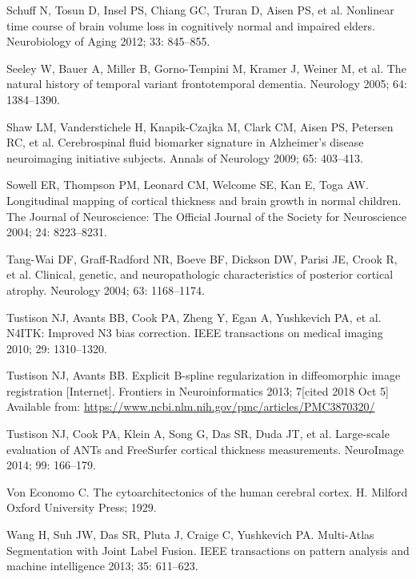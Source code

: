 \documentclass[]{article}
\begin{document}
\hypertarget{ref-schuff_nonlinear_2012}{}
Schuff N, Tosun D, Insel PS, Chiang GC, Truran D, Aisen PS, et al.
Nonlinear time course of brain volume loss in cognitively normal and
impaired elders. Neurobiology of Aging 2012; 33: 845--855.

\hypertarget{ref-seeley_natural_2005}{}
Seeley W, Bauer A, Miller B, Gorno-Tempini M, Kramer J, Weiner M, et al.
The natural history of temporal variant frontotemporal dementia.
Neurology 2005; 64: 1384--1390.

\hypertarget{ref-shaw_cerebrospinal_2009}{}
Shaw LM, Vanderstichele H, Knapik-Czajka M, Clark CM, Aisen PS, Petersen
RC, et al. Cerebrospinal fluid biomarker signature in Alzheimer's
disease neuroimaging initiative subjects. Annals of Neurology 2009; 65:
403--413.

\hypertarget{ref-sowell_longitudinal_2004}{}
Sowell ER, Thompson PM, Leonard CM, Welcome SE, Kan E, Toga AW.
Longitudinal mapping of cortical thickness and brain growth in normal
children. The Journal of Neuroscience: The Official Journal of the
Society for Neuroscience 2004; 24: 8223--8231.

\hypertarget{ref-tang-wai_clinical_2004}{}
Tang-Wai DF, Graff-Radford NR, Boeve BF, Dickson DW, Parisi JE, Crook R,
et al. Clinical, genetic, and neuropathologic characteristics of
posterior cortical atrophy. Neurology 2004; 63: 1168--1174.

\hypertarget{ref-tustison_n4itk:_2010}{}
Tustison NJ, Avants BB, Cook PA, Zheng Y, Egan A, Yushkevich PA, et al.
N4ITK: Improved N3 bias correction. IEEE transactions on medical imaging
2010; 29: 1310--1320.

\hypertarget{ref-tustison_explicit_2013}{}
Tustison NJ, Avants BB. Explicit B-spline regularization in
diffeomorphic image registration {[}Internet{]}. Frontiers in
Neuroinformatics 2013; 7{[}cited 2018 Oct 5{]} Available from:
\url{https://www.ncbi.nlm.nih.gov/pmc/articles/PMC3870320/}

\hypertarget{ref-tustison_large-scale_2014}{}
Tustison NJ, Cook PA, Klein A, Song G, Das SR, Duda JT, et al.
Large-scale evaluation of ANTs and FreeSurfer cortical thickness
measurements. NeuroImage 2014; 99: 166--179.

\hypertarget{ref-von_economo_cytoarchitectonics_1929}{}
Von Economo C. The cytoarchitectonics of the human cerebral cortex. H.
Milford Oxford University Press; 1929.

\hypertarget{ref-wang_multi-atlas_2013}{}
Wang H, Suh JW, Das SR, Pluta J, Craige C, Yushkevich PA. Multi-Atlas
Segmentation with Joint Label Fusion. IEEE transactions on pattern
analysis and machine intelligence 2013; 35: 611--623.
\end{document}
